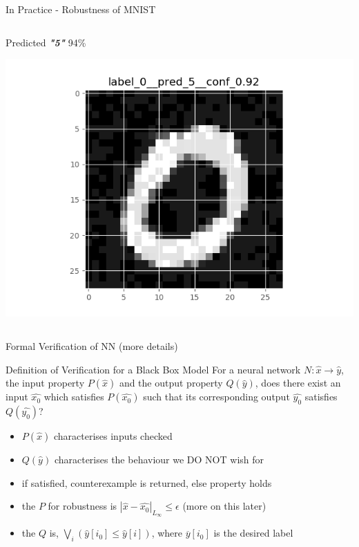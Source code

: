 \documentclass[t,compress,aspectratio=169]{beamer}
\begin{document}
\begin{frame}{In Practice - Robustness of MNIST}
\begin{columns}
\begin{column}{0.32\textwidth}
            \begin{center}
                        Predicted \textit{\textbf{"5"}} 94\%

             \includegraphics[width=\textwidth]{img/adv.png}
             \end{center}
        \end{column}
    \end{columns}


\end{frame}

\begin{frame}[fragile]{Formal Verification of NN (more details)}
	\vspace{-1em}
	\begin{alertblock}{Definition of Verification for a Black Box Model}
		For a neural network $N : \hat{x} \rightarrow \hat{y}$, the input property $P(\hat{x})$ and the output property $Q(\hat{y})$, does there exist an input $\hat{x_0}$ which satisfies $P(\hat{x_0})$ such that its corresponding output $\hat{y_0}$ satisfies $Q(\hat{y_0})$?
	\end{alertblock}
		\vspace{1em}
	\begin{itemize}

		\item $P(\hat{x})$ characterises inputs checked
		\item $Q(\hat{y})$ characterises the behaviour we \textcolor{aisecred}{DO NOT} wish for
		\item if satisfied, counterexample is returned, else property holds
		\item the $P$ for robustness is $|\hat{x} - \hat{x_0}|_{ L_{\infty}} \leq \epsilon$ (more on this later)
		\item the $Q$ is, $\bigvee_i(\hat{y}[i_0] \leq \hat{y}[i])$, where $\overline{y}[i_0]$ is the desired label
	\end{itemize}
\end{frame}
\end{document}
